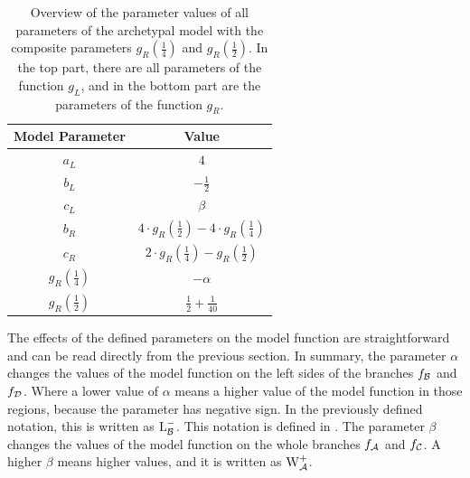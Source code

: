 \begin{table}
	\centering
	\begin{tabular}{|c|c|}
		\hline
		Model Parameter               & Value                                                                       \\ \hline \hline
		$a_L$                         & $4$                                                                         \\ \hline
		$b_L$                         & $-\frac{1}{2}$                                                              \\ \hline
		$c_L$                         & $\beta$                                                                     \\ \hline \hline
		$b_R$                         & $4 \cdot g_R\left(\frac{1}{2}\right) - 4 \cdot g_R\left(\frac{1}{4}\right)$ \\ \hline
		$c_R$                         & $2 \cdot g_R\left(\frac{1}{4}\right) - g_R\left(\frac{1}{2}\right)$         \\ \hline
		$g_R\left(\frac{1}{4}\right)$ & $-\alpha$                                                                   \\ \hline
		$g_R\left(\frac{1}{2}\right)$ & $\frac{1}{2} + \frac{1}{40}$                                                \\ \hline
	\end{tabular}
	\caption[Overview of parameters of the archetypal model]{
		Overview of the parameter values of all parameters of the archetypal model with the composite parameters $g_R\left(\frac{1}{4}\right)$ and $g_R\left(\frac{1}{2}\right)$.
		In the top part, there are all parameters of the function $g_L$, and in the bottom part are the parameters of the function $g_R$.
	}
	\label{table:setup.arch.parameters}
\end{table}

The effects of the defined parameters on the model function are straightforward and can be read directly from the previous section.
In summary, the parameter $\alpha$ changes the values of the model function on the left sides of the branches $f_{\mathcal{B}}$ and $f_{\mathcal{D}}$.
Where a lower value of $\alpha$ means a higher value of the model function in those regions, because the parameter has negative sign.
In the previously defined notation, this is written as $\operatorname{L}_{\mathcal{B}}^-$.
This notation is defined in .
The parameter $\beta$ changes the values of the model function on the whole branches $f_{\mathcal{A}}$ and $f_{\mathcal{C}}$.
A higher $\beta$ means higher values, and it is written as $\operatorname{W}_{\mathcal{A}}^+$.

